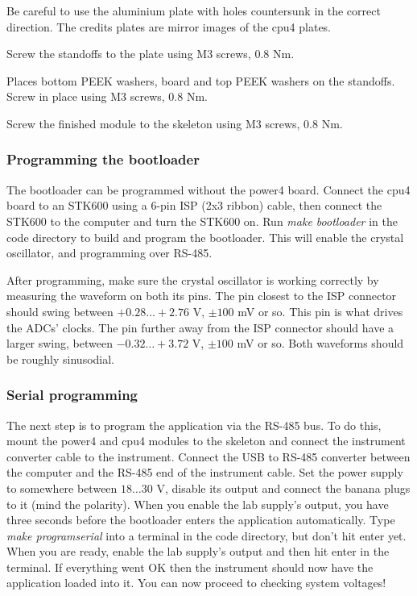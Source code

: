 \documentclass{article}
\begin{document}
Be careful to use the aluminium plate with holes countersunk in the correct direction.
The credits plates are mirror images of the cpu4 plates.

Screw the standoffs to the plate using M3 screws, 0.8 Nm.

Places bottom PEEK washers, board and top PEEK washers on the standoffs.
Screw in place using M3 screws, 0.8 Nm.

Screw the finished module to the skeleton using M3 screws, 0.8 Nm.

\subsubsection{Programming the bootloader}

The bootloader can be programmed without the power4 board.
Connect the cpu4 board to an STK600 using a 6-pin ISP (2x3 ribbon) cable,
then connect the STK600 to the computer and turn the STK600 on.
Run \emph{make bootloader} in the code directory to build and program the bootloader.
This will enable the crystal oscillator, and programming over RS-485.

After programming, make sure the crystal oscillator is working correctly by measuring the waveform on both its pins.
The pin closest to the ISP connector should swing between $+0.28 \dots +2.76$ V, $\pm 100$ mV or so.
This pin is what drives the ADCs' clocks.
The pin further away from the ISP connector should have a larger swing, between $-0.32 \dots +3.72$ V, $\pm 100$ mV or so.
Both waveforms should be roughly sinusodial.

\subsubsection{Serial programming}

The next step is to program the application via the RS-485 bus.
To do this, mount the power4 and cpu4 modules to the skeleton and connect the instrument converter cable to the instrument.
Connect the USB to RS-485 converter between the computer and the RS-485 end of the instrument cable.
Set the power supply to somewhere between $18 \dots 30$ V,
disable its output and connect the banana plugs to it (mind the polarity).
When you enable the lab supply's output, you have three seconds before the bootloader enters the application automatically.
Type \emph{make programserial} into a terminal in the code directory, but don't hit enter yet.
When you are ready, enable the lab supply's output and then hit enter in the terminal.
If everything went OK then the instrument should now have the application loaded into it.
You can now proceed to checking system voltages!
\end{document}

